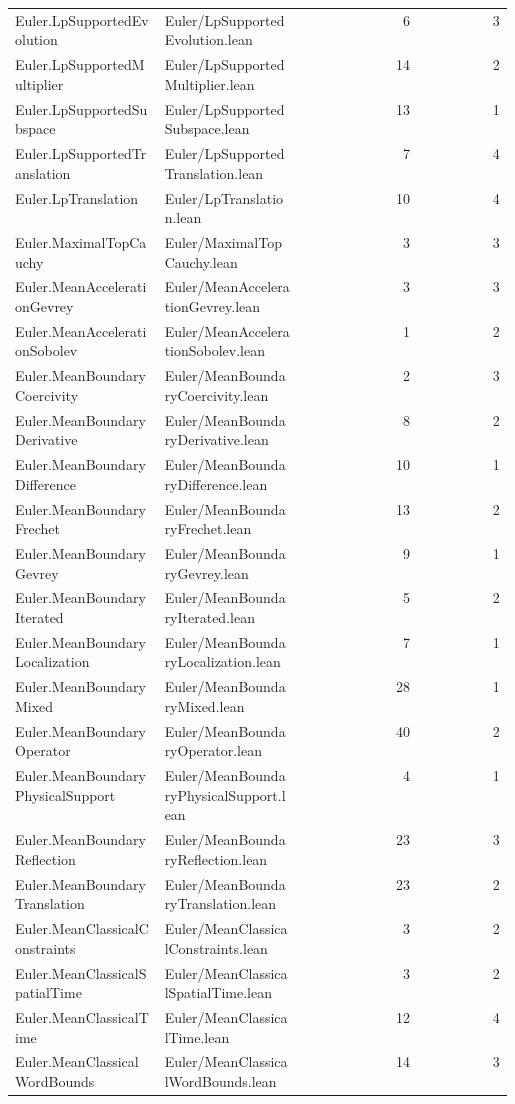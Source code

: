 \begin{longtable}{p{0.30\linewidth}p{0.28\linewidth}rr}
Euler.LpSupportedEvolution & Euler/LpSupportedEvolution.lean & 6 & 3\\
Euler.LpSupportedMultiplier & Euler/LpSupportedMultiplier.lean & 14 & 2\\
Euler.LpSupportedSubspace & Euler/LpSupportedSubspace.lean & 13 & 1\\
Euler.LpSupportedTranslation & Euler/LpSupportedTranslation.lean & 7 & 4\\
Euler.LpTranslation & Euler/LpTranslation.lean & 10 & 4\\
Euler.MaximalTopCauchy & Euler/MaximalTopCauchy.lean & 3 & 3\\
Euler.MeanAccelerationGevrey & Euler/MeanAccelerationGevrey.lean & 3 & 3\\
Euler.MeanAccelerationSobolev & Euler/MeanAccelerationSobolev.lean & 1 & 2\\
Euler.MeanBoundaryCoercivity & Euler/MeanBoundaryCoercivity.lean & 2 & 3\\
Euler.MeanBoundaryDerivative & Euler/MeanBoundaryDerivative.lean & 8 & 2\\
Euler.MeanBoundaryDifference & Euler/MeanBoundaryDifference.lean & 10 & 1\\
Euler.MeanBoundaryFrechet & Euler/MeanBoundaryFrechet.lean & 13 & 2\\
Euler.MeanBoundaryGevrey & Euler/MeanBoundaryGevrey.lean & 9 & 1\\
Euler.MeanBoundaryIterated & Euler/MeanBoundaryIterated.lean & 5 & 2\\
Euler.MeanBoundaryLocalization & Euler/MeanBoundaryLocalization.lean & 7 & 1\\
Euler.MeanBoundaryMixed & Euler/MeanBoundaryMixed.lean & 28 & 1\\
Euler.MeanBoundaryOperator & Euler/MeanBoundaryOperator.lean & 40 & 2\\
Euler.MeanBoundaryPhysicalSupport & Euler/MeanBoundaryPhysicalSupport.lean & 4 & 1\\
Euler.MeanBoundaryReflection & Euler/MeanBoundaryReflection.lean & 23 & 3\\
Euler.MeanBoundaryTranslation & Euler/MeanBoundaryTranslation.lean & 23 & 2\\
Euler.MeanClassicalConstraints & Euler/MeanClassicalConstraints.lean & 3 & 2\\
Euler.MeanClassicalSpatialTime & Euler/MeanClassicalSpatialTime.lean & 3 & 2\\
Euler.MeanClassicalTime & Euler/MeanClassicalTime.lean & 12 & 4\\
Euler.MeanClassicalWordBounds & Euler/MeanClassicalWordBounds.lean & 14 & 3\\

\end{longtable}
